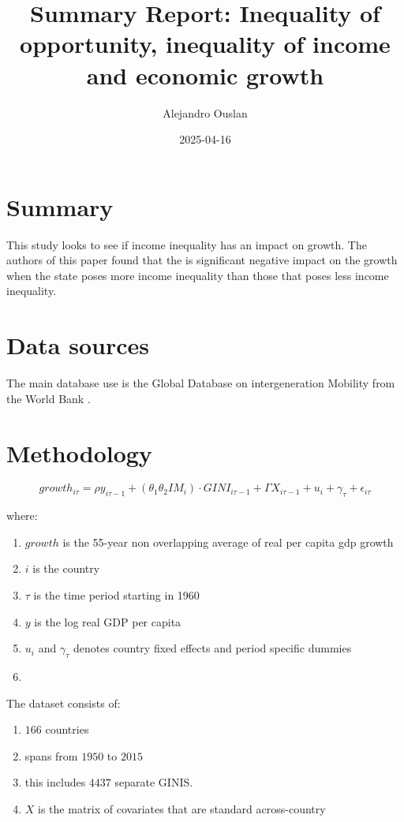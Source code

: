 \documentclass[10pt, oneside]{article}
\title{Summary Report: Inequality of opportunity, inequality of income and economic growth}
\author{Alejandro Ouslan}
\date{2025-04-16}
\begin{document}
\maketitle
\tableofcontents

\vspace{.25in}

\section{Summary}
This study \cite{aiyar2020inequality} looks to see if income inequality has an impact on growth. The authors of this paper found that
the is significant negative impact on the growth when the state poses more income inequality than those that poses less income inequality.
\section{Data sources}
The main database use is the Global Database on intergeneration Mobility from the World Bank \cite{gdim2018global}.

\section{Methodology}
\begin{equation}
	growth_{i \tau} = \rho y_{i \tau - 1} + (\theta_1 \theta_2 IM_i) \cdot GINI_{i \tau -1} + \Gamma X_{i \tau-1} + u_i + \gamma_{\tau} + \epsilon_{i \tau}
\end{equation}

where:
\begin{enumerate}
	\item $growth$ is the 55-year non overlapping average of real per capita gdp growth
	\item $i$ is the country
	\item $\tau$ is the time period starting in 1960
	\item $y$ is the log real GDP per capita
	\item $u_i$ and $\gamma_\tau$ denotes country fixed effects and period specific dummies
	\item
\end{enumerate}

The dataset consists of:
\begin{enumerate}
	\item $166$ countries
	\item spans from $1950$ to $2015$
	\item this includes $4437$ separate GINIS.
	\item $X$ is the matrix of covariates that are standard across-country
\end{enumerate}
\end{document}
